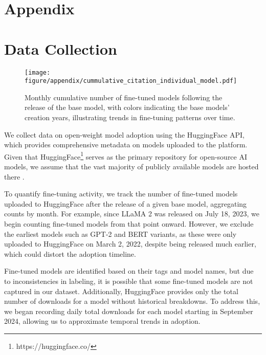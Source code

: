 \documentclass{article} %
\begin{document}
%
%


\clearpage

\appendix
\section*{Appendix}
\section{Data Collection}\label{sec:data_collection}
 \begin{figure}[ht]
        \begin{center}
            \texttt{[image: figure/appendix/cummulative\_citation\_individual\_model.pdf]}
        \end{center}
        \caption{Monthly cumulative number of fine-tuned models following the release of the base model, with colors indicating the base models' creation years, illustrating trends in fine-tuning patterns over time.}
        \label{fig:monthly_cummulative_finetune_number}
    \end{figure}

We collect data on open-weight model adoption using the HuggingFace API, which provides comprehensive metadata on models uploaded to the platform. Given that HuggingFace\footnote{https://huggingface.co/} serves as the primary repository for open-source AI models, we assume that the vast majority of publicly available models are hosted there .

To quantify fine-tuning activity, we track the number of fine-tuned models uploaded to HuggingFace after the release of a given base model, aggregating counts by month. For example, since LLaMA 2 was released on July 18, 2023, we begin counting fine-tuned models from that point onward. However, we exclude the earliest models such as GPT-2 and BERT variants, as these were only uploaded to HuggingFace on March 2, 2022, despite being released much earlier, which could distort the adoption timeline.

Fine-tuned models are identified based on their tags and model names, but due to inconsistencies in labeling, it is possible that some fine-tuned models are not captured in our dataset. Additionally, HuggingFace provides only the total number of downloads for a model without historical breakdowns. To address this, we began recording daily total downloads for each model starting in September 2024, allowing us to approximate temporal trends in adoption.
\end{document}
